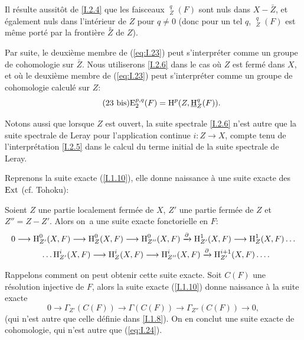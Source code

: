 \begin{remarques} \label{I.2.7} Il r\'esulte aussit\^{o}t de \ref{I.2.4} que les faisceaux $\mathop{\underline{\mathrm{H}}}\nolimits_Z^q(F)$ sont nuls dans $X-\bar{Z}$, et \'egalement nuls dans l'int\'erieur de $Z$ pour $q\neq 0$ (donc pour un tel $q$, $\mathop{\underline{\mathrm{H}}}\nolimits_Z^q(F)$ est m\^eme port\'e par la fronti\`ere $\overset{\circ}{Z}$ de $Z$).

Par suite, le deuxi\`eme membre de (\ref{eq:I.23}) peut s'interpr\'eter comme un groupe de cohomologie sur $\bar{Z}$. Nous utiliserons \ref{I.2.6} dans le cas o\`u $Z$ est ferm\'e dans $X$, et o\`u le deuxi\`eme membre de (\ref{eq:I.23}) peut s'interpr\'eter comme un groupe de cohomologie calcul\'e sur $Z$:
\begin{equation} \label{eq:I.23bis}\tag{23 bis} {\operatorname{E}_2^{p, q}(F) = \operatorname{H}^p(Z, \mathop{\underline{\mathrm{H}}}\nolimits_Z^q(F))}.
\end{equation}
\end{remarques}
\ignorespaces

Notons aussi que lorsque $Z$ est ouvert, la suite spectrale \ref{I.2.6} n'est autre que la suite spectrale de Leray pour l'application continue $i: Z \to X$, compte tenu de l'interpr\'etation \ref{I.2.5} dans le calcul du terme initial de la suite spectrale de Leray.

\bigskip Reprenons la suite exacte (\ref{I.1.10}), elle donne naissance \`a une suite exacte des $\operatorname{Ext}$ (cf. Tohoku):

\begin{theoreme} \label{I.2.8}
Soient $Z$ une partie localement ferm\'ee de $X$, $Z'$ une partie ferm\'ee de $Z$ et $Z''=Z-Z'$. Alors on~a une suite exacte fonctorielle en $F$:
\begin{equation} \label{eq:I.24}
\begin{gathered}
0 \to \H_{Z'}^0(X, F) \to \H_Z^0(X, F) \to \H_{Z''}^0(X, F)\lto{\partial} \H^1_{Z'}(X, F) \to \H^1_Z(X, F) \dots \\
\phantom{0}\dots \H_{Z'}^i(X, F) \to \H_Z^i(X, F) \to \H_{Z''}^i(X, F)\lto{\partial} \H^{i+1}_{Z'}(X, F)\dots.
\end{gathered}
\end{equation}
\end{theoreme}

Rappelons comment on peut obtenir cette suite exacte. Soit $C(F)$ une r\'esolution injective de $F$, alors la suite exacte (\ref{I.1.10}) donne naissance \`a la suite exacte
\begin{equation} \label{eq:I.25} {0 \to \Gamma_{Z'}(C(F)) \to \Gamma(C(F)) \to \Gamma_{Z''}(C(F)) \to 0},
\end{equation}
(qui n'est autre que celle d\'efinie dans \ref{I.1.8}). On en conclut une suite exacte de cohomologie, qui n'est autre que (\ref{eq:I.24}).


